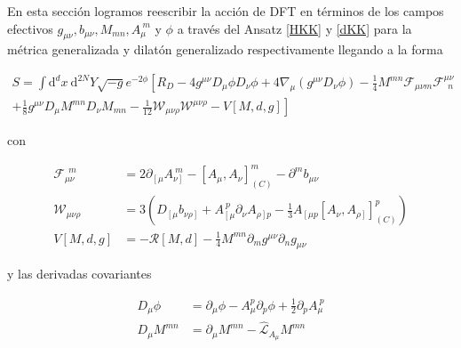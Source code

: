 \documentclass{article}
\numberwithin{equation}{section}
\begin{document}
\begin{boxumen}
	
	En esta sección logramos reescribir la acción de DFT en términos de los campos efectivos $ g_{\mu \nu}, b_{\mu \nu}, M_{m n}, A_{\mu}^{\ m}$ y $ \phi $ a través del Ansatz \ref{HKK} y \ref{dKK} para la métrica generalizada y dilatón generalizado respectivamente llegando a la forma
	
	\begin{equation}
	\begin{aligned}
	S = \int \mathrm{d}^d x \ \mathrm{d}^{2N} Y \sqrt{-g}e^{-2 \phi} \left[ R_D -4g^{\mu \nu} D_{\mu} \phi D_{\nu} \phi + 4 \nabla_{\mu} \left(g^{\mu \nu} D_{\nu} \phi\right) - \frac{1}{4} M^{m n} \mathcal{F}_{\mu \nu m} \mathcal{F}^{\mu \nu}_{\ \ n} \right.\\
	\left. + \frac{1}{8} g^{\mu \nu} D_{\mu} M^{m n} D_{\nu} M_{m n}  - \frac{1}{12}\mathcal{W}_{\mu \nu \rho}\mathcal{W}^{\mu \nu \rho} - V[M,d,g] \right]
	\end{aligned}
	\end{equation}
	
	con 
	
	\begin{equation}
	\begin{aligned}
	\mathcal{F}_{\mu \nu}^{\ \ m} &= 2 \partial_{\left[\mu\right.} A_{\left. \nu\right]}^{\ m} - \left[A_{\mu}, A_{\nu} \right]_{(C)}^m - \partial^m b_{\mu \nu}\\
	\mathcal{W}_{\mu \nu \rho} &= 3 \left( D_{\left[ \mu \right.} b_{\left. \nu \rho \right]} + A_{\left[ \mu\right.}^{\ p} \partial_{\nu} A_{\left. \rho \right] p } - \frac{1}{3} A_{\left[ \mu p \right.} \left[A_{\nu}, A_{\left.\rho\right]} \right]_{(C)}^p\right)\\
	V[M,d,g] &= -\mathcal{R}[M,d] - \frac{1}{4} M^{m n} \partial_m g^{\mu \nu} \partial_n g_{\mu \nu}
	\end{aligned}
	\end{equation}
	
	y las derivadas covariantes
	
	\begin{equation}
	\begin{aligned}
	D_{\mu} \phi &= \partial_{\mu} \phi - A_{\mu}^p \partial_p \phi + \frac{1}{2} \partial_p A_{\mu}^{\ p}\\
	D_{\mu}M^{m n} &= \partial_{\mu} M^{m n} - \hat{\mathcal{L}}_{A_{\mu}} M^{m n}
	\end{aligned}
	\end{equation} 
	

\end{boxumen}
\end{document}

